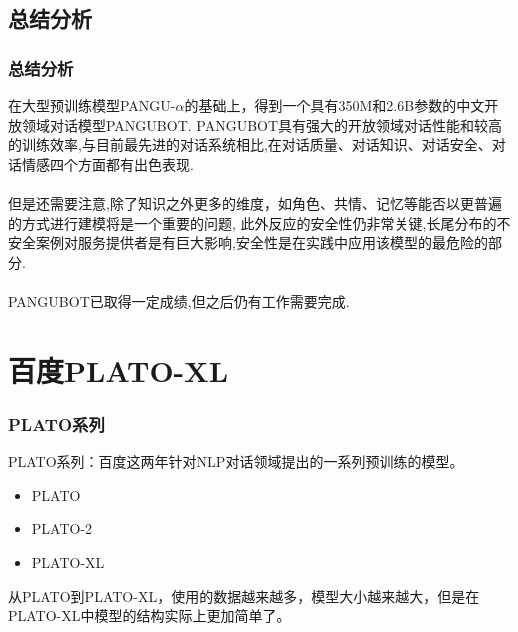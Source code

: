 \documentclass{beamer}
\begin{document}
\subsection{总结分析}
\begin{frame}
    \frametitle{总结分析}
    在大型预训练模型PANGU-$\alpha$的基础上，得到一个具有350M和2.6B参数的中文开放领域对话模型PANGUBOT.
    PANGUBOT具有强大的开放领域对话性能和较高的训练效率,与目前最先进的对话系统相比,在对话质量、对话知识、对话安全、对话情感四个方面都有出色表现.
    \\ \hspace*{\fill} \\
    但是还需要注意,除了知识之外更多的维度，如角色、共情、记忆等能否以更普遍的方式进行建模将是一个重要的问题,
    此外反应的安全性仍非常关键,长尾分布的不安全案例对服务提供者是有巨大影响,安全性是在实践中应用该模型的最危险的部分.
    \\ \hspace*{\fill} \\
    PANGUBOT已取得一定成绩,但之后仍有工作需要完成.

\end{frame}




\section{百度PLATO-XL}
\begin{frame}
    \frametitle{PLATO系列}

    PLATO系列：百度这两年针对NLP对话领域提出的一系列预训练的模型。

    \begin{itemize}
        \item PLATO
        \item PLATO-2
        \item PLATO-XL
    \end{itemize}

    从PLATO到PLATO-XL，使用的数据越来越多，模型大小越来越大，但是在PLATO-XL中模型的结构实际上更加简单了。
\end{frame}
\end{document}
